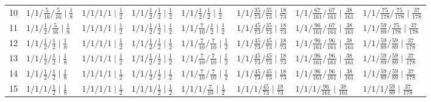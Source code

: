 {\begin{tabular}{rlllllll}
10 & $1/1/\tfrac{5}{16}/\tfrac{5}{16} \mid \tfrac{1}{8}$ & $1/1/1/1 \mid \tfrac{1}{2}$ & $1/1/\tfrac{1}{2}/\tfrac{1}{2} \mid \tfrac{1}{2}$ & $1/1/\tfrac{1}{2}/\tfrac{1}{2} \mid \tfrac{1}{2}$ & $1/1/\tfrac{35}{73}/\tfrac{35}{73} \mid \tfrac{18}{73}$ & $1/1/\tfrac{67}{161}/\tfrac{67}{161} \mid \tfrac{38}{161}$ & $1/1/\tfrac{75}{178}/\tfrac{75}{178} \mid \tfrac{37}{178}$\\
11 & $1/1/\tfrac{1}{2}/\tfrac{5}{16} \mid \tfrac{1}{8}$ & $1/1/1/1 \mid \tfrac{1}{2}$ & $1/1/\tfrac{1}{2}/\tfrac{1}{2} \mid \tfrac{1}{2}$ & $1/1/\tfrac{7}{10}/\tfrac{1}{2} \mid \tfrac{1}{2}$ & $1/1/\tfrac{45}{73}/\tfrac{35}{73} \mid \tfrac{18}{73}$ & $1/1/\tfrac{96}{161}/\tfrac{67}{161} \mid \tfrac{38}{161}$ & $1/1/\tfrac{59}{89}/\tfrac{75}{178} \mid \tfrac{37}{178}$\\
12 & $1/1/\tfrac{1}{2}/\tfrac{1}{2} \mid \tfrac{1}{8}$ & $1/1/1/1 \mid \tfrac{1}{2}$ & $1/1/\tfrac{1}{2}/\tfrac{1}{2} \mid \tfrac{1}{2}$ & $1/1/\tfrac{7}{10}/\tfrac{7}{10} \mid \tfrac{1}{2}$ & $1/1/\tfrac{45}{73}/\tfrac{45}{73} \mid \tfrac{18}{73}$ & $1/1/\tfrac{96}{161}/\tfrac{96}{161} \mid \tfrac{38}{161}$ & $1/1/\tfrac{59}{89}/\tfrac{59}{89} \mid \tfrac{37}{178}$\\
13 & $1/1/\tfrac{1}{2}/\tfrac{1}{2} \mid \tfrac{1}{8}$ & $1/1/1/1 \mid \tfrac{1}{2}$ & $1/1/\tfrac{1}{2}/\tfrac{1}{2} \mid \tfrac{1}{2}$ & $1/1/\tfrac{7}{10}/\tfrac{7}{10} \mid \tfrac{1}{2}$ & $1/1/\tfrac{45}{73}/\tfrac{45}{73} \mid \tfrac{18}{73}$ & $1/1/\tfrac{96}{161}/\tfrac{96}{161} \mid \tfrac{38}{161}$ & $1/1/\tfrac{59}{89}/\tfrac{59}{89} \mid \tfrac{37}{178}$\\
14 & $1/1/\tfrac{1}{2}/\tfrac{1}{2} \mid \tfrac{1}{8}$ & $1/1/1/1 \mid \tfrac{1}{2}$ & $1/1/\tfrac{1}{2}/\tfrac{1}{2} \mid \tfrac{1}{2}$ & $1/1/\tfrac{7}{10}/\tfrac{7}{10} \mid \tfrac{1}{2}$ & $1/1/\tfrac{45}{73}/\tfrac{45}{73} \mid \tfrac{18}{73}$ & $1/1/\tfrac{96}{161}/\tfrac{96}{161} \mid \tfrac{38}{161}$ & $1/1/\tfrac{59}{89}/\tfrac{59}{89} \mid \tfrac{37}{178}$\\
15 & $1/1/1/\tfrac{1}{2} \mid \tfrac{1}{8}$ & $1/1/1/1 \mid \tfrac{1}{2}$ & $1/1/1/\tfrac{1}{2} \mid \tfrac{1}{2}$ & $1/1/1/\tfrac{7}{10} \mid \tfrac{1}{2}$ & $1/1/1/\tfrac{45}{73} \mid \tfrac{18}{73}$ & $1/1/1/\tfrac{96}{161} \mid \tfrac{38}{161}$ & $1/1/1/\tfrac{59}{89} \mid \tfrac{37}{178}$\\
\bottomrule
\end{tabular}}
